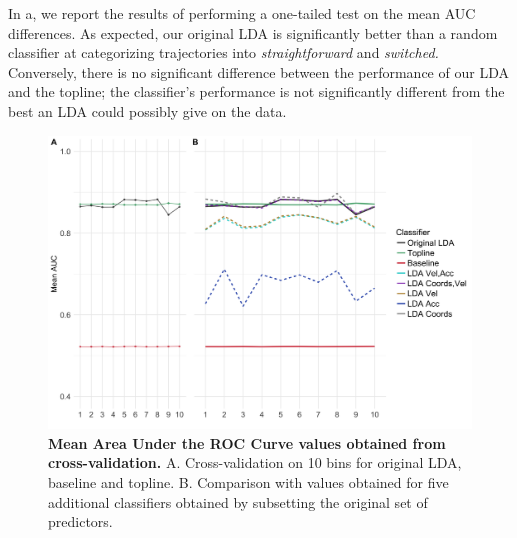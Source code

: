 \documentclass[draft]{article}
\begin{document}
In a, we report the results of performing a one-tailed test on the mean AUC differences. As expected, our original LDA is significantly better than a random classifier at categorizing trajectories into \emph{straightforward} and \emph{switched.} Conversely, there is no significant difference between the performance of our LDA and the topline; the classifier's performance is not significantly different from the best an LDA could possibly give on the data. 

\begin{figure}[h]
\centering
\includegraphics[width=\textwidth]{auc_calibration_1.png}
\caption{\textbf{Mean Area Under the ROC Curve values obtained from cross-validation.} A. Cross-validation on 10 bins for original LDA, baseline and topline. B. Comparison with values obtained for five additional classifiers obtained by subsetting the original set of predictors.} \label{DIST:AUC}
\end{figure}
\end{document}
